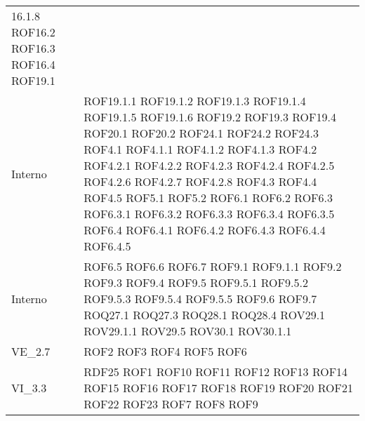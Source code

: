 \begin{longtable}{p{2.5cm}!{\VRule[1pt]}p{2.5cm}}
16.1.8 \newline ROF16.2 \newline ROF16.3 \newline ROF16.4 \newline ROF19.1 \\ Interno & ROF19.1.1 \newline ROF19.1.2 \newline ROF19.1.3 \newline ROF19.1.4 \newline ROF19.1.5 \newline ROF19.1.6 \newline ROF19.2 \newline ROF19.3 \newline ROF19.4 \newline ROF20.1 \newline ROF20.2 \newline ROF24.1 \newline ROF24.2 \newline ROF24.3 \newline ROF4.1 \newline ROF4.1.1 \newline ROF4.1.2 \newline ROF4.1.3 \newline ROF4.2 \newline ROF4.2.1 \newline ROF4.2.2 \newline ROF4.2.3 \newline ROF4.2.4 \newline ROF4.2.5 \newline ROF4.2.6 \newline ROF4.2.7 \newline ROF4.2.8 \newline ROF4.3 \newline ROF4.4 \newline ROF4.5 \newline ROF5.1 \newline ROF5.2 \newline ROF6.1 \newline ROF6.2 \newline ROF6.3 \newline ROF6.3.1 \newline ROF6.3.2 \newline ROF6.3.3 \newline ROF6.3.4 \newline ROF6.3.5 \newline ROF6.4 \newline ROF6.4.1 \newline ROF6.4.2 \newline ROF6.4.3 \newline ROF6.4.4 \newline ROF6.4.5 \\ Interno & ROF6.5 \newline ROF6.6 \newline ROF6.7 \newline ROF9.1 \newline ROF9.1.1 \newline ROF9.2 \newline ROF9.3 \newline ROF9.4 \newline ROF9.5 \newline ROF9.5.1 \newline ROF9.5.2 \newline ROF9.5.3 \newline ROF9.5.4 \newline ROF9.5.5 \newline ROF9.6 \newline ROF9.7 \newline ROQ27.1 \newline ROQ27.3 \newline ROQ28.1 \newline ROQ28.4 \newline ROV29.1 \newline ROV29.1.1 \newline ROV29.5 \newline ROV30.1 \newline ROV30.1.1\\
	VE_2.7 & ROF2 \newline ROF3 \newline ROF4 \newline ROF5 \newline ROF6\\
	VI_3.3 & RDF25 \newline ROF1 \newline ROF10 \newline ROF11 \newline ROF12 \newline ROF13 \newline ROF14 \newline ROF15 \newline ROF16 \newline ROF17 \newline ROF18 \newline ROF19 \newline ROF20 \newline ROF21 \newline ROF22 \newline ROF23 \newline ROF7 \newline ROF8 \newline ROF9 \newli
\end{longtable}
